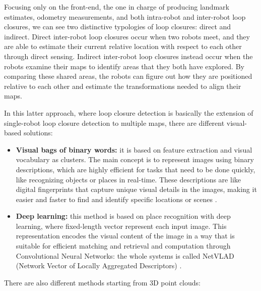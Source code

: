Focusing only on the front-end, the one in
charge of producing landmark estimates, odometry measurements, and both intra-robot and
inter-robot loop closures, we can see two distinctive typologies of loop closures: direct and indirect. Direct inter-robot loop closures occur when two robots meet, and they are able to estimate their current relative location with respect to each other through direct sensing. Indirect inter-robot loop closures instead occur when the robots examine their maps to identify areas that they both have explored. By comparing these shared areas, the robots can figure out how they are positioned relative to each other and estimate the transformations needed to align their maps.

In this latter approach, where loop closure detection is basically the extension of single-robot loop closure detection
to multiple maps, there are different visual-based solutions:

\begin{itemize}
    \item \textbf{Visual bags of binary words:} it is based on feature extraction and visual vocabulary as clusters. The main concept is to represent images using binary descriptions, which are highly efficient for tasks that need to be done quickly, like recognizing objects or places in real-time. These descriptions are like digital fingerprints that capture unique visual details in the images, making it easier and faster to find and identify specific locations or scenes \cite{galvez2012bags}.

    \item \textbf{Deep learning:} this method is based on place recognition with deep learning, where fixed-length vector represent each input image. This representation encodes the visual content of the image in a way that is suitable for efficient matching and retrieval and computation through Convolutional Neural Networks: the whole systems is called NetVLAD (Network Vector of Locally Aggregated Descriptors) \cite{arandjelovic2016netvlad}.

\end{itemize}

There are also different methods starting from 3D point clouds:

